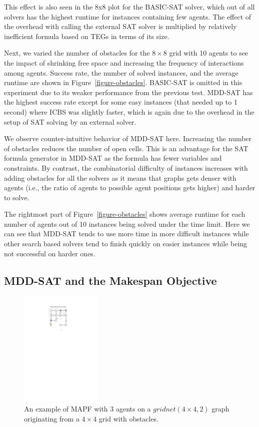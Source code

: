 \documentclass[jair,oneside,11pt]{article}
\begin{document}
This effect is also seen in the 8x8 plot for the BASIC-SAT solver, which out of all solvers has the highest runtime for instances containing few agents. The effect of the overhead with calling the external SAT solver is multiplied by relatively inefficient formula based on TEGs in terms of its size.

Next, we varied the number of obstacles for the $8{}\times{}8$ grid with 10 agents to see the impact of shrinking free space and increasing the frequency of interactions among agents. Success rate, the number of solved instances, and the average runtime are shown in Figure~\ref{figure-obstacles}. BASIC-SAT is omitted in this experiment due to its weaker performance from the previous test. MDD-SAT has the highest success rate except for some easy instances (that needed up to 1 second) where ICBS was slightly faster, which is again due to the overhead in the setup of SAT solving by an external solver.

We observe counter-intuitive behavior of MDD-SAT here. Increasing the number of obstacles reduces the number of open cells. This is an advantage for the SAT formula generator in MDD-SAT as the formula has fewer variables and constraints. By contrast, the combinatorial difficulty of instances increases with adding obstacles for all the solvers as it means that graphs gets denser with agents (i.e., the ratio of agents to possible agent positions gets higher) and harder to solve.

The rightmost part of Figure~\ref{figure-obstacles} shows average runtime for each number of agents out of 10 instances being solved under the time limit. Here we can see that MDD-SAT tends to use more time in more difficult instances while other search based solvers tend to finish quickly on easier instances while being not successful on harder ones.

\pagebreak
\subsection{MDD-SAT and the Makespan Objective}

\begin{figure}
\vspace{-1.0cm}
\begin{center}
\includegraphics[trim={7.0cm 21.3cm 8.8cm 2.8cm},clip,width=0.35\textwidth]{fig_GRIDNET.pdf}
\end{center}
\caption{An example of MAPF with 3 agents on a $gridnet(4 \times 4, 2)$ graph originating from a $4 \times 4$ grid with obstacles.} \label{figure-GRIDNET}
\end{figure}
\end{document}
